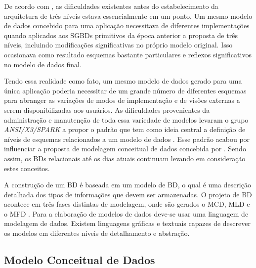 De acordo com , as dificuldades existentes antes do estabelecimento da arquitetura de três níveis estava essencialmente em um ponto. 
Um mesmo modelo de dados concebido para uma aplicação necessitava de diferentes implementações quando aplicados aos \acp{SGBD} primitivos da época anterior a proposta de três níveis, incluindo modificações significativas no próprio modelo original. 
Isso ocasionava como resultado esquemas bastante particulares e reflexos significativos no modelo de dados final.

Tendo essa realidade como fato, um mesmo modelo de dados gerado para uma única aplicação poderia necessitar de um grande número de diferentes esquemas para abranger as variações de modos de implementação e de visões externas a serem disponibilizadas aos usuários. 
As dificuldades provenientes da administração e manutenção de toda essa variedade de modelos levaram o grupo \textit{ANSI/X3/SPARK} a propor o padrão que tem como ideia central a definição de níveis de esquemas relacionados a um modelo de dados \cite{Cougo:2013}.
Esse padrão acabou por influenciar a proposta de modelagem conceitual de dados concebida por . 
Sendo assim, os \acp{BD} relacionais até os dias atuais continuam levando em consideração estes conceitos. 

A construção de um \ac{BD} é baseada em um modelo de \ac{BD}, o qual é uma descrição detalhada dos tipos de informações que devem ser armazenadas. 
O projeto de \ac{BD} acontece em três fases distintas de modelagem, onde são gerados o \ac{MCD}, \ac{MLD} e o \ac{MFD} \cite{Heuser:2009}. 
Para a elaboração de modelos de dados deve-se usar uma linguagem de modelagem de dados. 
Existem linguagens gráficas e textuais capazes de descrever os modelos em diferentes níveis de detalhamento e abstração.  


\subsection{Modelo Conceitual de Dados} \label{ssec:ModelConceitual}

